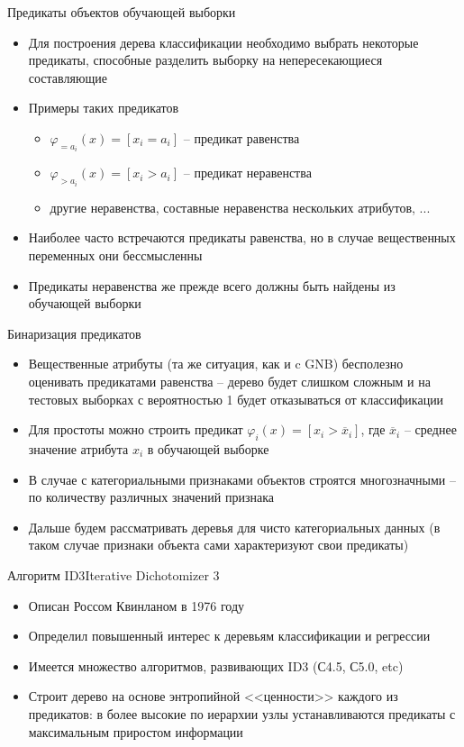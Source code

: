 \documentclass[compress,red,unicode]{beamer}
\begin{document}
\begin{frame}{Предикаты объектов обучающей выборки}
\begin{itemize}
\item Для построения дерева классификации необходимо выбрать некоторые предикаты, способные разделить выборку на непересекающиеся составляющие
\item Примеры таких предикатов
\begin{itemize}
	\item $\varphi_{=a_i} (x) = [x_i = a_i]$ -- предикат равенства
	\item $\varphi_{>a_i} (x) = [x_i > a_i]$ -- предикат неравенства
	\item другие неравенства, составные неравенства нескольких атрибутов, ...
\end{itemize}
\item Наиболее часто встречаются предикаты равенства, но в случае вещественных переменных они бессмысленны
\item Предикаты неравенства же прежде всего должны быть найдены из обучающей выборки

\end{itemize}
\end{frame}

\begin{frame}{Бинаризация предикатов}
\begin{itemize}
	\item Вещественные атрибуты (та же ситуация, как и c GNB) бесполезно оценивать предикатами равенства -- дерево будет слишком сложным и на тестовых выборках с вероятностью 1 будет отказываться от классификации
	\item Для простоты можно строить предикат $\varphi_i(x) = [x_i > \overline{x}_i]$, где $\overline{x}_i$ -- среднее значение атрибута $x_i$ в обучающей выборке
	\item В случае с категориальными признаками объектов строятся многозначными -- по количеству различных значений признака
	\item Дальше будем рассматривать деревья для чисто категориальных данных (в таком случае признаки объекта сами характеризуют свои предикаты)
\end{itemize}
\end{frame}

\begin{frame}{Алгоритм ID3}{Iterative Dichotomizer 3}
\begin{itemize}
	\item Описан Россом Квинланом в 1976 году
	\item Определил повышенный интерес к деревьям классификации и регрессии
	\item Имеется множество алгоритмов, развивающих ID3 (С4.5, С5.0, etc)
	\item Строит дерево на основе энтропийной <<ценности>> каждого из предикатов: в более высокие по иерархии узлы устанавливаются предикаты с максимальным приростом информации
\end{itemize}
\end{frame}
\end{document}
